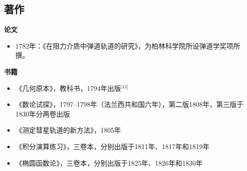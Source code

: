 \subsection{著作}
\textbf{论文}
\begin{itemize}
\item 1782年：《在阻力介质中弹道轨道的研究》，为柏林科学院所设弹道学奖项所撰。
\end{itemize}
\textbf{书籍}
\begin{itemize}
\item 《几何原本》，教科书，1794年出版\(^\text{[11]}\)
\item 《数论试探》，1797–1798年（法兰西共和国六年），第二版1808年，第三版于1830年分两卷出版
\item 《测定彗星轨道的新方法》，1805年
\item 《积分演算练习》，三卷本，分别出版于1811年、1817年和1819年
\item 《椭圆函数论》，三卷本，分别出版于1825年、1826年和1830年
\end{itemize}